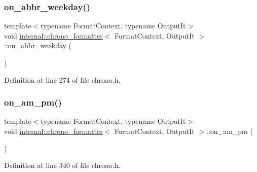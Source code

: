 \subsubsection{\texorpdfstring{on\+\_\+abbr\+\_\+weekday()}{on\_abbr\_weekday()}}
{\footnotesize\ttfamily template$<$typename Format\+Context, typename Output\+It$>$ \\
void \hyperlink{structinternal_1_1chrono__formatter}{internal\+::chrono\+\_\+formatter}$<$ Format\+Context, Output\+It $>$\+::on\+\_\+abbr\+\_\+weekday (\begin{DoxyParamCaption}{ }\end{DoxyParamCaption})\hspace{0.3cm}{\ttfamily [inline]}}



Definition at line 274 of file chrono.\+h.

\mbox{\label{structinternal_1_1chrono__formatter_a4491be3f9b0474c5eeb29f95ed5fa426}} 
\subsubsection{\texorpdfstring{on\+\_\+am\+\_\+pm()}{on\_am\_pm()}}
{\footnotesize\ttfamily template$<$typename Format\+Context, typename Output\+It$>$ \\
void \hyperlink{structinternal_1_1chrono__formatter}{internal\+::chrono\+\_\+formatter}$<$ Format\+Context, Output\+It $>$\+::on\+\_\+am\+\_\+pm (\begin{DoxyParamCaption}{ }\end{DoxyParamCaption})\hspace{0.3cm}{\ttfamily [inline]}}



Definition at line 340 of file chrono.\+h.

\mbox{\label{structinternal_1_1chrono__formatter_ad1ce1f229948a67141aa320f185f9bf3}} 
